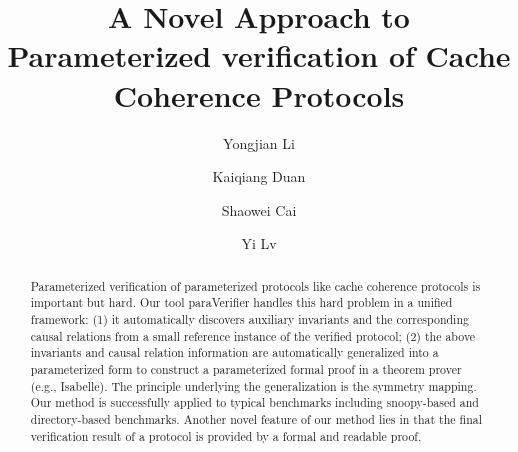 \documentclass[final]{IEEEtran}
\begin{document}
\title{ {\sf A Novel Approach to Parameterized verification of Cache Coherence Protocols}
}
\author{Yongjian Li  \and
        Kaiqiang Duan  \and
        Shaowei Cai  \and
        Yi Lv
}
\maketitle
\begin{abstract}
Parameterized verification of parameterized protocols like cache coherence protocols is important
but hard.   Our tool {\sf paraVerifier} handles this hard problem in
a unified framework: (1) it automatically  discovers auxiliary invariants and the
corresponding causal relations %
 from a small reference instance of the verified protocol; (2) the above
invariants and causal relation information  are automatically generalized into a parameterized
form to construct a parameterized formal proof in a theorem prover
(e.g., Isabelle). The principle underlying the generalization is the
symmetry mapping. Our method is successfully applied to typical
benchmarks including  snoopy-based and directory-based benchmarks. Another novel
feature of our method lies in that the final verification result of a
protocol is provided by a formal and readable proof.%

\end{abstract}

\end{document}
